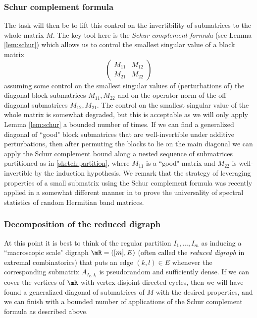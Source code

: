 \documentclass[aop,preprint]{imsart}
\theoremstyle{plain}
\theoremstyle{definition}
\theoremstyle{remark}
\numberwithin{equation}{section}
\numberwithin{theorem}{section}
\begin{document}
\subsubsection*{Schur complement formula}

The task will then be to lift this control on the invertibility of submatrices to the whole matrix $M$. 
The key tool here is the \emph{Schur complement formula} (see Lemma \ref{lem:schur}) which allows us to control the smallest singular value of a block matrix
\begin{equation}	\label{sketch:partition}
\begin{pmatrix} M_{11} & M_{12} \\ M_{21} & M_{22} \end{pmatrix}
\end{equation}
assuming some control on the smallest singular values of (perturbations of) the diagonal block submatrices $M_{11},M_{22}$ and on the operator norm of the off-diagonal submatrices $M_{12}, M_{21}$.
The control on the smallest singular value of the whole matrix is somewhat degraded, but this is acceptable as we will only apply Lemma \ref{lem:schur} a bounded number of times.
If we can find a generalized diagonal of ``good" block submatrices that are well-invertible under additive perturbations, 
then after permuting the blocks to lie on the main diagonal we can apply the Schur complement bound along a nested sequence of submatrices partitioned as in \eqref{sketch:partition}, where $M_{11}$ is a ``good" matrix and $M_{22}$ is well-invertible by the induction hypothesis.
We remark that the strategy of leveraging properties of a small submatrix using the Schur complement formula was recently applied in a somewhat different manner in \citep{BEYY:band} to prove the universality of spectral statistics of random Hermitian band matrices. 


\subsubsection*{Decomposition of the reduced digraph} 

At this point it is best to think of the regular partition $I_1,\dots, I_m$ as inducing a ``macroscopic scale" digraph $\mR = ([m],E)$ (often called the \emph{reduced digraph} in extremal combinatorics) that puts an edge $(k,l)\in E$ whenever the corresponding submatrix $A_{I_k,I_l}$ is pseudorandom and sufficiently dense. 
If we can cover the vertices of $\mR$ with vertex-disjoint directed cycles, then we will have found a generalized diagonal of submatrices of $M$ with the desired properties, and we can finish with a bounded number of applications of the Schur complement formula as described above. 
\end{document}
